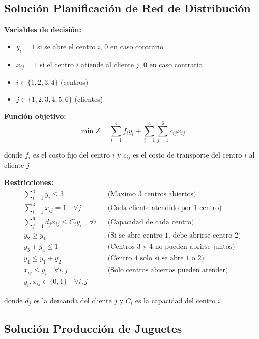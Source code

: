 \documentclass[12pt]{article}
\begin{document}
\subsection{Solución Planificación de Red de Distribución}

\textbf{Variables de decisión:}
\begin{itemize}
    \item $y_i = 1$ si se abre el centro $i$, 0 en caso contrario
    \item $x_{ij} = 1$ si el centro $i$ atiende al cliente $j$, 0 en caso contrario
    \item $i \in \{1, 2, 3, 4\}$ (centros)
    \item $j \in \{1, 2, 3, 4, 5, 6\}$ (clientes)
\end{itemize}

\textbf{Función objetivo:}
$$\min Z = \sum_{i=1}^{4} f_i y_i + \sum_{i=1}^{4} \sum_{j=1}^{6} c_{ij} x_{ij}$$
\begin{center}
donde $f_i$ es el costo fijo del centro $i$ y $c_{ij}$ es el costo de transporte del centro $i$ al cliente $j$
\end{center}

\textbf{Restricciones:}
\begin{align*}
    \sum_{i=1}^{4} y_i \leq 3 && \text{(Maximo 3 centros abiertos)} \\
    \sum_{i=1}^{4} x_{ij} = 1 \quad \forall j && \text{(Cada cliente atendido por 1 centro)} \\
    \sum_{j=1}^{6} d_j x_{ij} \leq C_i y_i \quad \forall i && \text{(Capacidad de cada centro)} \\
    y_2 \geq y_1 && \text{(Si se abre centro 1, debe abrirse centro 2)} \\
    y_3 + y_4 \leq 1 && \text{(Centros 3 y 4 no pueden abrirse juntos)} \\
    y_4 \leq y_1 + y_2 && \text{(Centro 4 solo si se abre 1 o 2)} \\
    x_{ij} \leq y_i \quad \forall i,j && \text{(Solo centros abiertos pueden atender)} \\
    y_i, x_{ij} \in \{0,1\} \quad \forall i,j
\end{align*}
\begin{center}
donde $d_j$ es la demanda del cliente $j$ y $C_i$ es la capacidad del centro $i$
\end{center}

\subsection{Solución Producción de Juguetes}
\end{document}
